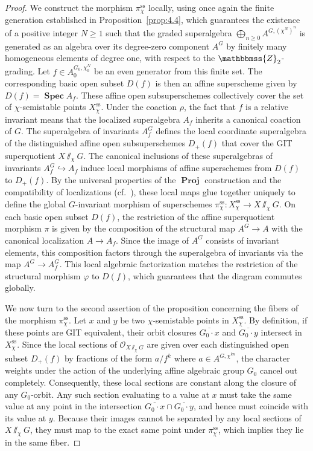 \documentclass[11pt,a4paper,reqno,noamsfonts]{amsart}
\numberwithin{equation}{section}
\theoremstyle{definition}
\theoremstyle{remark}
\newcommand{\ZZ}{\ensuremath{\mathbbmss{Z}}}
\newcommand{\Ocal}{\ensuremath{\mathscr{O}}}
\newcommand{\uss}{\ensuremath{\mathrm{ss}}}
\DeclareMathOperator{\sSpec}{\mathbf{Spec}}
\DeclareMathOperator{\sProj}{\mathbf{Proj}}
\begin{document}
\begin{proof}
We construct the morphism $\pi^{\uss}_{\chi}$ locally, using once again the finite generation established in Proposition~\ref{prop:4.4}, which guarantees the existence of a positive integer $N \geq 1$ such that the graded superalgebra $\bigoplus_{n \geq 0} A^{G,(\chi^{N})^{n}}$  is generated as an algebra over its degree-zero component $A^{G}$ by finitely many homogeneous elements of degree one, with respect to the $\ZZ_2$-grading. Let $f \in A_0^{G_0,\chi_0^N}$ be an even generator from this finite set. The corresponding basic open subset $D(f)$ is then an affine superscheme given by $D(f) = \sSpec A_f$. These affine open subsuperschemes collectively cover the set of $\chi$-semistable points $X_{\chi }^{\uss}$. Under the coaction $\rho$, the fact that $f$ is a relative invariant means that the localized superalgebra $A_{f}$ inherits a canonical coaction of $G$. The superalgebra of invariants $A_{f}^{G}$ defines the local coordinate superalgebra of the distinguished affine open subsuperschemes $D_+(f)$ that cover the GIT superquotient $X {\sslash_{\chi}} G$. The canonical inclusions of these superalgebras of invariants $A_f^G \hookrightarrow A_f$ induce local morphisms of affine superschemes from $D(f)$ to $D_+(f)$. By the universal properties of the $\sProj$ construction and the compatibility of localizations (cf.~\cite[\S2.3]{BruzzoHernandezRuiperezPolishchuk2023}), these local maps glue together uniquely to define the global $G$-invariant morphism of superschemes $\pi^{\uss}_{\chi} \colon X^{\uss}_{\chi} \to X {\sslash_{\chi}} G$. On each basic open subset $D(f)$, the restriction of the affine superquotient morphism $\pi$ is given by the composition of the structural map $A^G \to A$ with the canonical localization $A \to A_f$. Since the image of $A^{G}$ consists of invariant elements, this composition factors through the superalgebra of invariants via the map $A^G \to A_f^G$. This local algebraic factorization matches the restriction of the structural morphism $\varphi$ to $D(f)$, which guarantees that the diagram commutes globally.

We now turn to the second assertion of the proposition concerning the fibers of the morphism $\pi^{\uss}_{\chi}$. Let $x$ and $y$ be two $\chi$-semistable points in $X_{\chi }^{\uss}$. By definition, if these points are GIT equivalent, their orbit closures $\overline{G_{0}\cdot x}$ and $\overline{G_{0}\cdot y}$ intersect in $X_{\chi }^{\uss}$. Since the local sections of $\Ocal_{X {\sslash_{\chi}} G}$ are given over each distinguished open subset $D_+(f)$ by fractions of the form $a/f^k$ where $a \in A^{G,\chi^{kn}}$, the character weights under the action of the underlying affine algebraic group $G_{0}$ cancel out completely. Consequently, these local sections are constant along the closure of any $G_{0}$-orbit. Any such section evaluating to a value at $x$ must take the same value at any point in the intersection $\overline{G_{0}\cdot x} \cap \overline{G_{0}\cdot y}$, and hence must coincide with its value at $y$. Because their images cannot be separated by any local sections of $X {\sslash_{\chi}} G$, they must map to the exact same point under $\pi^{\uss}_{\chi}$, which implies they lie in the same fiber.


\end{proof}
\end{document}
